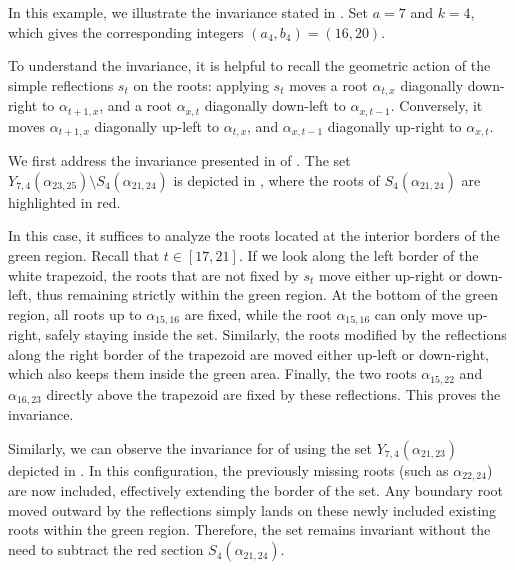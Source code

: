 
\begin{example}\rm
In this example, we illustrate the invariance stated in . 
Set $a=7$ and $k=4$, which gives the corresponding integers $(a_{4},b_{4}) = (16,20)$. 

\medskip
To understand the invariance, it is helpful to recall the geometric action of the simple reflections $s_t$ on the roots: applying $s_t$ moves a root $\alpha_{t,x}$ diagonally down-right to $\alpha_{t+1,x}$, and a root $\alpha_{x,t}$ diagonally down-left to $\alpha_{x,t-1}$. Conversely, it moves $\alpha_{t+1,x}$ diagonally up-left to $\alpha_{t,x}$, and $\alpha_{x,t-1}$ diagonally up-right to $\alpha_{x,t}$.

\medskip
We first address the invariance presented in  of . The set $Y_{7,4}(\alpha_{23,25})\setminus S_{4}(\alpha_{21,24})$ is depicted in , where the roots of $S_{4}(\alpha_{21,24})$ are highlighted in red. 

\medskip
In this case, it suffices to analyze the roots located at the interior borders of the green region. Recall that $t\in [17,21]$. If we look along the left border of the white trapezoid, the roots that are not fixed by $s_t$ move either up-right or down-left, thus remaining strictly within the green region. At the bottom of the green region, all roots up to $\alpha_{15,16}$ are fixed, while the root $\alpha_{15,16}$ can only move up-right, safely staying inside the set. Similarly, the roots modified by the reflections along the right border of the trapezoid are moved either up-left or down-right, which also keeps them inside the green area. Finally, the two roots $\alpha_{15,22}$ and $\alpha_{16,23}$ directly above the trapezoid are fixed by these reflections. 
This  proves the invariance.

\medskip
Similarly, we can observe the invariance for  of  using the set $Y_{7,4}(\alpha_{21,23})$ depicted in . In this configuration, the previously missing roots (such as $\alpha_{22,24}$) are now included, effectively extending the border of the set. Any boundary root moved outward by the reflections simply lands on these newly included existing roots within the green region. Therefore, the set remains invariant without the need to subtract the red section $S_4(\alpha_{21,24})$.


\end{example}
